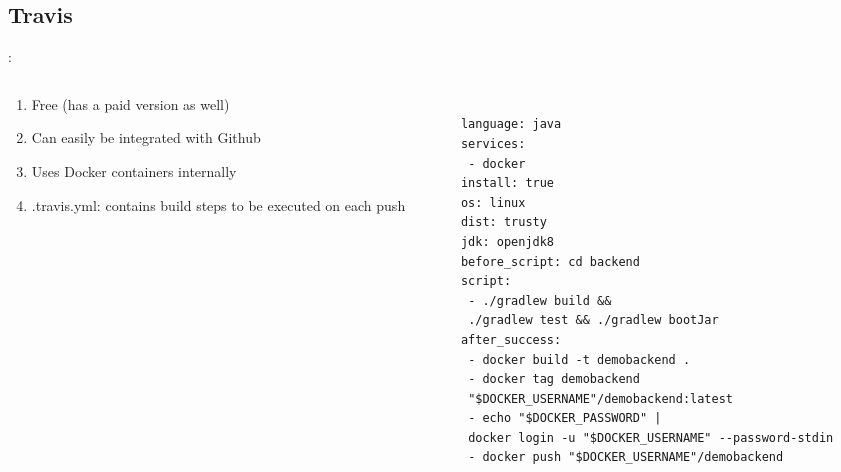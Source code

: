 \documentclass{beamer}
\begin{document}
\subsection{Travis}
\begin{frame}[fragile]{\secname : \subsecname}


\begin{columns}
\begin{column}{0.3\textwidth}
\begin{enumerate}
    \item Free (has a paid version as well)
    \item Can easily be integrated with Github
    \item Uses Docker containers internally
    \item .travis.yml: contains build steps to be executed on each push
\end{enumerate}
\end{column}

\begin{column}{0.7\textwidth}

\begin{scriptsize}
\begin{verbatim}

language: java
services:
 - docker
install: true
os: linux
dist: trusty
jdk: openjdk8
before_script: cd backend
script:
 - ./gradlew build && 
 ./gradlew test && ./gradlew bootJar
after_success:
 - docker build -t demobackend .
 - docker tag demobackend 
 "$DOCKER_USERNAME"/demobackend:latest
 - echo "$DOCKER_PASSWORD" | 
 docker login -u "$DOCKER_USERNAME" --password-stdin
 - docker push "$DOCKER_USERNAME"/demobackend

\end{verbatim}
\end{scriptsize}

\end{column}
\end{columns}
\end{frame}
\end{document}
